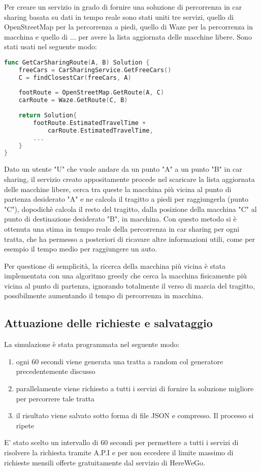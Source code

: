 Per creare un servizio in grado di fornire una soluzione di percorrenza in car sharing basata su dati in tempo reale sono stati uniti tre servizi, quello di OpenStreetMap per la percorrenza a piedi, quello di Waze per la percorrenza in macchina e quello di ... per avere la lista aggiornata delle macchine libere. Sono stati usati nel seguente modo:
\begin{lstlisting}[language=Go]
func GetCarSharingRoute(A, B) Solution {
	freeCars = CarSharingService.GetFreeCars()
	C = findClosestCar(freeCars, A)
	
	footRoute = OpenStreetMap.GetRoute(A, C)
	carRoute = Waze.GetRoute(C, B)
	
	return Solution{
		footRoute.EstimatedTravelTime +
			carRoute.EstimatedTravelTime,
		...
	}
}
\end{lstlisting}
Dato un utente "U" che vuole andare da un punto "A" a un punto "B" in car sharing, il servizio creato appositamente procede nel scaricare la lista aggiornata delle macchine libere, cerca tra queste la macchina più vicina al punto di partenza desiderato "A" e ne calcola il tragitto a piedi per raggiungerla (punto "C"), dopodichè calcola il resto del tragitto, dalla posizione della macchina "C" al punto di destinazione desiderato "B", in macchina. Con questo metodo si è ottenuta una stima in tempo reale della percorrenza in car sharing per ogni tratta, che ha permesso a posteriori di ricavare altre informazioni utili, come per esempio il tempo medio per raggiungere un auto.

Per questione di semplicità, la ricerca della macchina più vicina è stata implementata con una algoritmo greedy che cerca la macchina fisicamente più vicina al punto di partenza, ignorando totalmente il verso di marcia del tragitto, possibilmente aumentando il tempo di percorrenza in macchina.

\subsection{Attuazione delle richieste e salvataggio}

La simulazione è stata programmata nel seguente modo:
\begin{enumerate}
\item ogni 60 secondi viene generata una tratta a random col generatore precedentemente discusso
\item parallelamente viene richiesto a tutti i servizi di fornire la soluzione migliore per percorrere tale tratta
\item il risultato viene salvato sotto forma di file JSON e compresso. Il processo si ripete
\end{enumerate}
E' stato scelto un intervallo di 60 secondi per permettere a tutti i servizi di risolvere la richiesta tramite A.P.I e per non eccedere il limite massimo di richieste mensili offerte gratuitamente dal servizio di HereWeGo.



